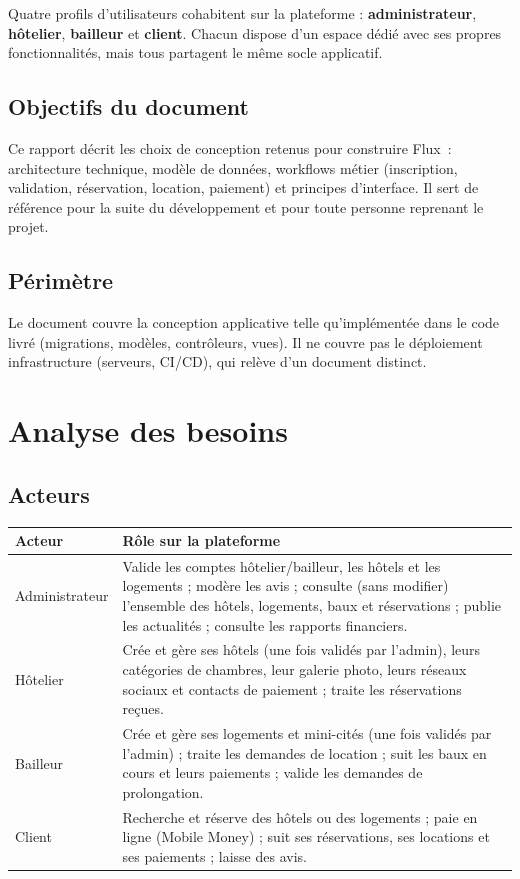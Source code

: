 \documentclass[11pt,a4paper]{report}
\begin{document}
Quatre profils d'utilisateurs cohabitent sur la plateforme : \textbf{administrateur}, \textbf{hôtelier}, \textbf{bailleur} et \textbf{client}. Chacun dispose d'un espace dédié avec ses propres fonctionnalités, mais tous partagent le même socle applicatif.

\section{Objectifs du document}
Ce rapport décrit les choix de conception retenus pour construire Flux~: architecture technique, modèle de données, workflows métier (inscription, validation, réservation, location, paiement) et principes d'interface. Il sert de référence pour la suite du développement et pour toute personne reprenant le projet.

\section{Périmètre}
Le document couvre la conception applicative telle qu'implémentée dans le code livré (migrations, modèles, contrôleurs, vues). Il ne couvre pas le déploiement infrastructure (serveurs, CI/CD), qui relève d'un document distinct.

\chapter{Analyse des besoins}

\section{Acteurs}

\begin{longtable}{p{2.8cm}p{11.5cm}}
\toprule
\textbf{Acteur} & \textbf{Rôle sur la plateforme} \\
\midrule
\endhead
Administrateur & Valide les comptes hôtelier/bailleur, les hôtels et les logements ; modère les avis ; consulte (sans modifier) l'ensemble des hôtels, logements, baux et réservations ; publie les actualités ; consulte les rapports financiers. \\
Hôtelier & Crée et gère ses hôtels (une fois validés par l'admin), leurs catégories de chambres, leur galerie photo, leurs réseaux sociaux et contacts de paiement ; traite les réservations reçues. \\
Bailleur & Crée et gère ses logements et mini-cités (une fois validés par l'admin) ; traite les demandes de location ; suit les baux en cours et leurs paiements ; valide les demandes de prolongation. \\
Client & Recherche et réserve des hôtels ou des logements ; paie en ligne (Mobile Money) ; suit ses réservations, ses locations et ses paiements ; laisse des avis. \\
\bottomrule
\end{longtable}
\end{document}

